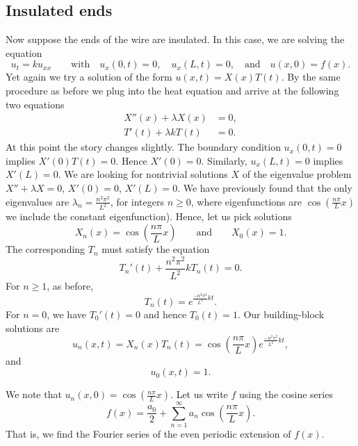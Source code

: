 \documentclass{ximera}
\begin{document}
\subsection{Insulated ends}

Now suppose the ends of the wire are insulated.  In this case, we are solving the equation
\begin{equation*}
    u_t = k u_{xx} \qquad \text{with} \quad u_x(0,t) = 0, \quad u_x(L,t) = 0, \quad \text{and} \quad u(x,0) = f(x) .
\end{equation*}
Yet again we try a solution of the form $u(x,t) = X(x)T(t)$.  By the same procedure as before we plug into the heat equation and arrive at the following two equations
\begin{align*}
    X''(x) + \lambda X(x) &= 0 , \\
    T'(t) + \lambda k T(t) &= 0 .
\end{align*}
At this point the story changes slightly. The boundary condition $u_x(0,t) = 0$ implies $X'(0)T(t) = 0$. Hence $X'(0) = 0$.  Similarly, $u_x(L,t) = 0$ implies $X'(L) = 0$. We are looking for nontrivial solutions $X$ of the eigenvalue problem $X'' + \lambda X = 0$, $X'(0) = 0$, $X'(L) = 0$.  We have previously found that the only eigenvalues are $\lambda_n = \frac{n^2 \pi^2}{L^2}$, for integers $n \geq 0$, where eigenfunctions are $\cos \left( \frac{n \pi}{L} x\right)$ we include the constant eigenfunction).  Hence, let us pick solutions
\begin{equation*}
    X_n (x) = \cos \left( \frac{n \pi}{L} x \right) \qquad \text{and} \qquad X_0 (x) = 1.
\end{equation*}
The corresponding $T_n$ must satisfy the equation
\begin{equation*}
    T_n'(t) + \frac{n^2 \pi^2}{L^2} k T_n(t) = 0 .
\end{equation*}
For $n \geq 1$, as before,
\begin{equation*}
    T_n(t) = e^{\frac{-n^2 \pi^2}{L^2} k t} .
\end{equation*}
For $n = 0$, we have $T_0'(t) = 0$ and hence $T_0(t) = 1$. Our building-block solutions are
\begin{equation*}
    u_n(x,t) = X_n(x)T_n(t) = \cos \left( \frac{n \pi}{L} x \right) e^{\frac{-n^2 \pi^2}{L^2} k t} ,
\end{equation*}
and
\begin{equation*}
    u_0(x,t) = 1 .
\end{equation*}

We note that $u_n(x,0) = \cos \left( \frac{n \pi}{L} x \right)$.  Let us write $f$ using the cosine series
\begin{equation*}
f(x) = \frac{a_0}{2} + \sum_{n=1}^\infty a_n \cos \left( \frac{n \pi}{L} x \right) .
\end{equation*}
That is, we find the Fourier series of the even periodic extension of $f(x)$.
\end{document}

